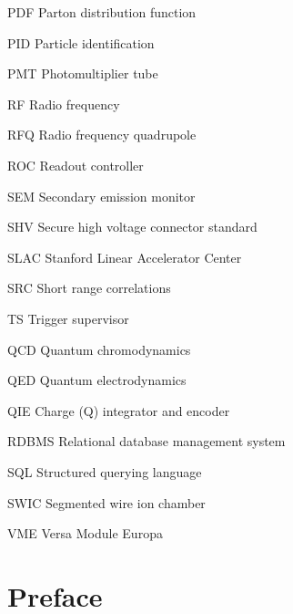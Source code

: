 \documentclass[edeposit,fullpage]{uiucthesis2009}
\begin{document}
\begin{symbollist*}
	\item[PDF] Parton distribution function
	\item[PID] Particle identification
	\item[PMT] Photomultiplier tube
	\item[RF] Radio frequency
	\item[RFQ] Radio frequency quadrupole
	\item[ROC] Readout controller
	\item[SEM] Secondary emission monitor
	\item[SHV] Secure high voltage connector standard
	\item[SLAC] Stanford Linear Accelerator Center
	\item[SRC] Short range correlations
	\item[TS] Trigger supervisor
	\item[QCD] Quantum chromodynamics
	\item[QED] Quantum electrodynamics
	\item[QIE] Charge (Q) integrator and encoder
	\item[RDBMS] Relational database management system
	\item[SQL] Structured querying language
	\item[SWIC] Segmented wire ion chamber
	\item[VME] Versa Module Europa
\end{symbollist*}

%

\mainmatter

\chapter*{Preface}
\end{document}
